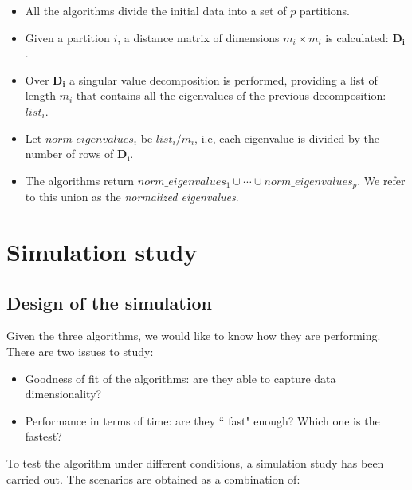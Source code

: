 \documentclass[11pt]{report}
\begin{document}
\begin{itemize}
\item All the algorithms divide the initial data into a set of $p$ partitions.

\item Given a partition $i$, a distance matrix of dimensions $m_i \times m_i$
is calculated: $\mathbf{D_i}$. 

\item Over $\mathbf{D_i}$ a singular value decomposition is performed, providing 
a list of length $m_i$ that contains all the eigenvalues of the previous 
decomposition: $list_i$.

\item Let $norm\_eigenvalues_i$ be $list_i/m_i$, i.e, each eigenvalue is divided
by the number of rows of $\mathbf{D_i}$.

\item The algorithms return 
$norm\_eigenvalues_1 \cup \cdots \cup norm\_eigenvalues_p$. We refer to 
this union as the \textit{normalized eigenvalues}. 

\end{itemize}





\chapter{Simulation study}

\section{Design of the simulation}

\label{chap:sim}
Given the three algorithms, we would like to know how they are 
performing. There are two issues to study:

\begin{itemize}
\item Goodness of fit of the algorithms: are they able to capture data
dimensionality?
\item Performance in terms of time: are they `` fast" enough? Which one is 
the fastest?
\end{itemize}

To test the algorithm under different conditions, a simulation study has been
carried out. The scenarios are obtained as a combination of:
\end{document}
